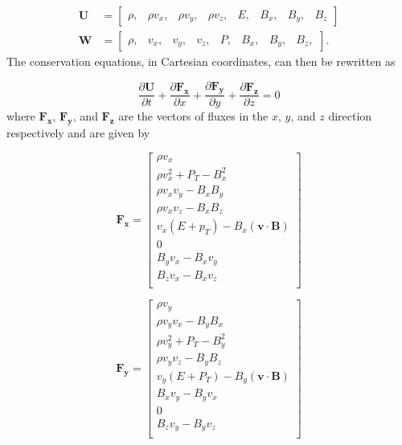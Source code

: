\documentclass[modern, linenumbers]{aastex631}
\begin{document}
\begin{align}
    \boldsymbol{U} &= \begin{bmatrix}
            \rho , &
            \rho v_x, &
            \rho v_y, &
            \rho v_z, &
            E,   &
            B_x, &
            B_y, &
            B_z
         \end{bmatrix}
    \\
    \boldsymbol{W} &= \begin{bmatrix}
            \rho, &
            v_x, &
            v_y, &
            v_z, &
            P,   &
            B_x, &
            B_y, &
            B_z,
         \end{bmatrix}.
\end{align}
The conservation equations, in Cartesian coordinates, can then be rewritten as

\begin{equation}
    \label{eqn:vector-conserved}
    \frac{\partial \boldsymbol{U}}{\partial t} +
    \frac{\partial \boldsymbol{F_x}}{\partial x} +
    \frac{\partial \boldsymbol{F_y}}{\partial y} +
    \frac{\partial \boldsymbol{F_z}}{\partial z} = 0
\end{equation}
where $\boldsymbol{F_x}$, $\boldsymbol{F_y}$, and $\boldsymbol{F_z}$ are the vectors of fluxes in the $x$, $y$, and $z$ direction respectively and are given by

\begin{equation}
    \boldsymbol{F_x} = \begin{bmatrix}
            \rho v_{x} \\
            \rho v_{x}^2 + P_{T} - B_{x}^2 \\
            \rho v_{x} v_{y} - B_{x} B_{y} \\
            \rho v_{x} v_{z} - B_{x} B_{z} \\
            v_{x} \left( E + p_{T} \right) - B_{x} \left( \boldsymbol{v} \cdot \boldsymbol{B} \right) \\
            0 \\
            B_{y} v_{x} - B_{x} v_{y} \\
            B_{z} v_{x} - B_{x} v_{z} \\
         \end{bmatrix}
\end{equation}

\begin{equation}
    \boldsymbol{F_y} = \begin{bmatrix}
            \rho v_{y} \\
            \rho v_{y} v_{x} - B_{y} B_{x} \\
            \rho v_{y}^2 + P_{T} - B_{y}^2 \\
            \rho v_{y} v_{z} - B_{y} B_{z} \\
            v_{y} \left( E + P_{T} \right) - B_{y} \left( \boldsymbol{v} \cdot \boldsymbol{B} \right) \\
            B_{x} v_{y} - B_{y} v_{x} \\
            0 \\
            B_{z} v_{y} - B_{y} v_{z} \\
         \end{bmatrix}
\end{equation}
\end{document}
